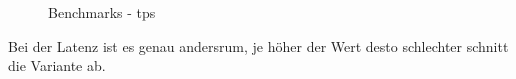 \begin{flushleft}
    \begin{figure}[H]
        \centering
        \qquad
        \caption{Benchmarks - tps}
        \label{fig:tps_varianten}
    \end{figure}
    Bei der Latenz ist es genau andersrum, je höher der Wert desto schlechter schnitt die Variante ab.\\
%


\end{flushleft}
